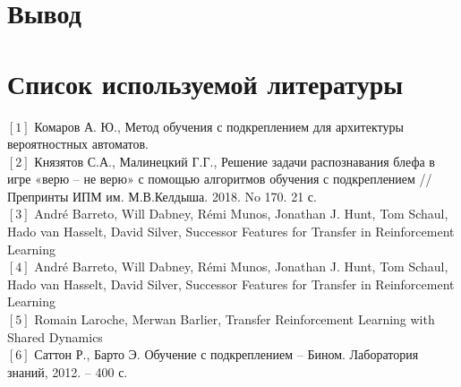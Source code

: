 \documentclass[12pt, a4paper]{report}
\theoremstyle{definition}
\theoremstyle{plain}
\theoremstyle{remark}
\theoremstyle{remark}
\theoremstyle{definition}
\begin{document}
\section{Вывод}

\newpage
\section{Список используемой литературы} 
$[1]$ Комаров А. Ю., Метод обучения с подкреплением для архитектуры вероятностных автоматов.\\
$[2]$ Князятов С.А., Малинецкий Г.Г.,
Решение задачи распознавания блефа в игре «верю – не верю» с помощью алгоритмов
обучения с подкреплением // Препринты ИПМ им. М.В.Келдыша. 2018. No 170. 21 с.\\
$[3]$ André Barreto, Will Dabney, Rémi Munos, Jonathan J. Hunt,
Tom Schaul, Hado van Hasselt, David Silver, Successor Features for
Transfer in Reinforcement Learning \\
$[4]$ André Barreto, Will Dabney, Rémi Munos, Jonathan J. Hunt,
Tom Schaul, Hado van Hasselt, David Silver, Successor Features for
Transfer in Reinforcement Learning \\
$[5]$ Romain Laroche, Merwan Barlier, Transfer Reinforcement Learning with Shared Dynamics \\
$[6]$ Саттон Р., Барто Э. Обучение с подкреплением – Бином. Лаборатория знаний,
2012. – 400 с.
\end{document}

